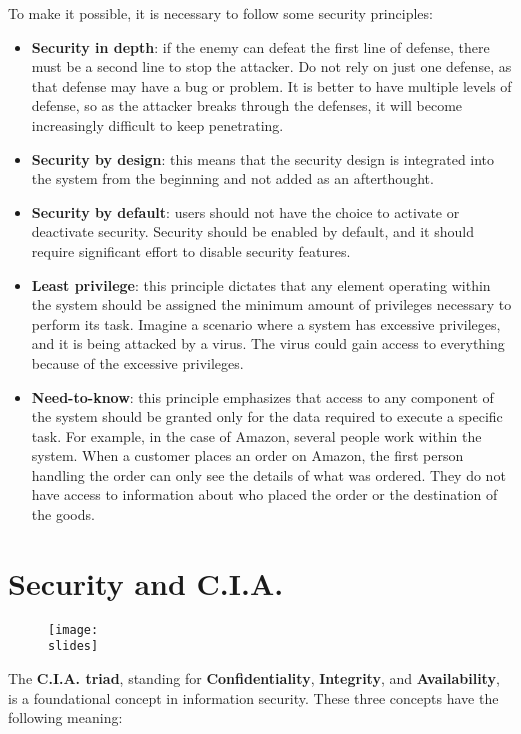 To make it possible, it is necessary to follow some security principles:
\begin{itemize}
  \item \textbf{Security in depth}: if the enemy can defeat the first line of defense, there must be a second line to stop the attacker. Do not rely on just one defense, as that defense may have a bug or problem. It is better to have multiple levels of defense, so as the attacker breaks through the defenses, it will become increasingly difficult to keep penetrating.

  \item \textbf{Security by design}: this means that the security design is integrated into the system from the beginning and not added as an afterthought.

  \item \textbf{Security by default}: users should not have the choice to activate or deactivate security. Security should be enabled by default, and it should require significant effort to disable security features.

  \item \textbf{Least privilege}: this principle dictates that any element operating within the system should be assigned the minimum amount of privileges necessary to perform its task. Imagine a scenario where a system has excessive privileges, and it is being attacked by a virus. The virus could gain access to everything because of the excessive privileges.

  \item \textbf{Need-to-know}: this principle emphasizes that access to any component of the system should be granted only for the data required to execute a specific task. For example, in the case of Amazon, several people work within the system. When a customer places an order on Amazon, the first person handling the order can only see the details of what was ordered. They do not have access to information about who placed the order or the destination of the goods.
\end{itemize}

\section{Security and C.I.A.}
\begin{figure}[h]
  \centering
  \texttt{[image: \\slides]}
\end{figure}
The \textbf{C.I.A. triad}, standing for \textbf{Confidentiality}, \textbf{Integrity}, and \textbf{Availability}, is a foundational concept in information security.
These three concepts have the following meaning:

